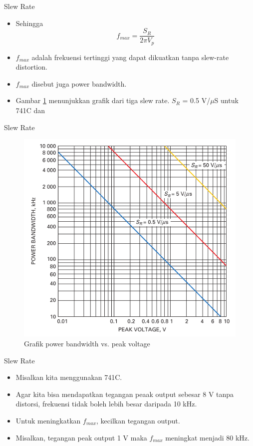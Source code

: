 \begin{frame}{Slew Rate}
	\begin{itemize}
		\item Sehingga
			\begin{equation} \label{pers.16.2}
				f_{max} = \frac{S_R}{2 \pi V_p}
			\end{equation}
		\item $ f_{max} $ adalah frekuensi tertinggi yang dapat dikuatkan tanpa slew-rate distortion.
		\item $ f_{max} $ disebut juga power bandwidth.
		\item Gambar \ref{fig-16.10} menunjukkan grafik dari tiga slew rate. $ S_R $ = 0.5 V/$\mu$S untuk 741C dan 
	\end{itemize}
\end{frame}


\begin{frame}{Slew Rate}
	\begin{figure}
		\centering
		\includegraphics[height=0.7\textheight]{gambar/fig-16.10}
		\caption{Grafik power bandwidth vs. peak voltage}
		\label{fig-16.10}
	\end{figure}
\end{frame}

\begin{frame}{Slew Rate}
	\begin{itemize}
		\item Misalkan kita menggunakan 741C.
		\item Agar kita bisa mendapatkan tegangan peaak output sebesar 8 V tanpa distorsi, frekuensi tidak boleh lebih besar daripada 10 kHz.
		\item Untuk meningkatkan $ f_{max} $, kecilkan tegangan output.
		\item Misalkan, tegangan peak output 1 V maka $ f_{max} $ meningkat menjadi 80 kHz.
	\end{itemize}
\end{frame}

